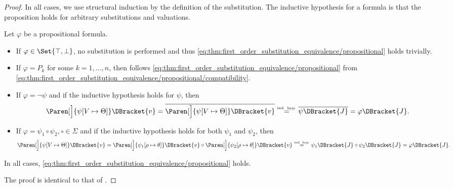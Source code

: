 \begin{proof}
  In all cases, we use structural induction by the definition of the substitution\IND. The inductive hypothesis for a formula is that the proposition holds for arbitrary substitutions and valuations.

   Let \( \varphi \) be a propositional formula.
  \begin{itemize}
    \item If \( \varphi \in \Set{ \top, \bot } \), no substitution is performed and thus \eqref{eq:thm:first_order_substitution_equivalence/propositional} holds trivially.

    \item If \( \varphi = P_k \) for some \( k = 1, \ldots, n \), then follows \eqref{eq:thm:first_order_substitution_equivalence/propositional} from \eqref{eq:thm:first_order_substitution_equivalence/propositional/compatibility}.

    \item If \( \varphi = \neg \psi \) and if the inductive hypothesis holds for \( \psi \), then
    \begin{equation*}
      \Paren[\Big]{ \psi[V \mapsto \Theta] }\DBracket{v}
      =
      \overline{\Paren[\Big]{ \psi[V \mapsto \Theta] }\DBracket{v}}
      \overset {\IndHyp} =
      \overline{\psi \DBracket{J}}
      =
      \varphi \DBracket{J}.
    \end{equation*}

    \item If \( \varphi = \psi_1 \circ \psi_2, \circ \in \Sigma \) and if the inductive hypothesis holds for both \( \psi_1 \) and \( \psi_2 \), then
    \begin{equation*}
      \Paren[\Big]{ \psi[V \mapsto \Theta] }\DBracket{v}
      =
      \Paren[\Big]{ \psi_1[\rho \mapsto \theta] }\DBracket{v} \circ \Paren[\Big]{ \psi_2[\rho \mapsto \theta] }\DBracket{v}
      \overset {\IndHyp} =
      \psi_1 \DBracket{J} \circ \psi_2\DBracket{J}
      =
      \varphi\DBracket{J}.
    \end{equation*}
  \end{itemize}

  In all cases, \eqref{eq:thm:first_order_substitution_equivalence/propositional} holds.

   The proof is identical to that of .


\end{proof}
